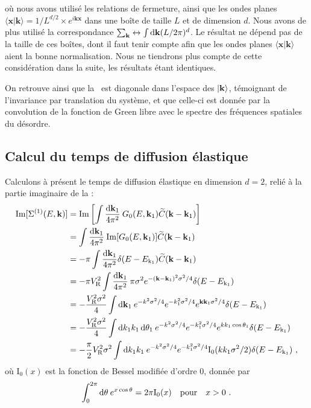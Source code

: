 où nous avons utilisé les relations de fermeture, ainsi que les ondes planes $\langle\mathbf{x}|\mathbf{k}\rangle=1/L^{d/2} \times e^{i\mathbf{k}\mathbf{x}}$ dans une boîte de taille $L$ et de dimension $d$. Nous avons de plus utilisé la correspondance $\sum_{\mathbf{k}} \leftrightarrow \int{\mathop{}\mathopen{}\mathrm{d}\mathbf{k} (L/2\pi)^d}$. Le résultat ne dépend pas de la taille de ces boîtes, dont il faut tenir compte afin que les ondes planes $\langle\mathbf{x}|\mathbf{k}\rangle$ aient la bonne normalisation. Nous ne tiendrons plus compte de cette considération dans la suite, les résultats étant identiques.

On retrouve ainsi que la \selfenergy\ est diagonale dans l'espace des $\left| \mathbf{k} \right\rangle$, témoignant de l'invariance par translation du système, et que celle-ci est donnée par la convolution de la fonction de Green libre avec le spectre des fréquences spatiales du désordre.


\subsection{Calcul du temps de diffusion élastique}
Calculons à présent le temps de diffusion élastique en dimension $d=2$, relié à la partie imaginaire de la \selfenergy :
\begin{align}
\mathrm{Im}[\Sigma^{(1)}(E,\mathbf{k})]&= \mathrm{Im} \left[ \int{\frac{\mathop{}\mathopen{}\mathrm{d}\mathbf{k}_{\mathrm{1}}}{4\pi^2}\: G_0(E,\mathbf{k}_{\mathrm{1}}) \widetilde{C}(\mathbf{k}-\mathbf{k}_{\mathrm{1}})}\right] \\ 
&= \int{\frac{\mathop{}\mathopen{}\mathrm{d}\mathbf{k}_{\mathrm{1}}}{4\pi^2}\: \mathrm{Im}[G_0(E,\mathbf{k}_{\mathrm{1}})] \widetilde{C}(\mathbf{k}-\mathbf{k}_{\mathrm{1}})} \\
&= -\pi \int{\frac{\mathop{}\mathopen{}\mathrm{d}\mathbf{k}_{\mathrm{1}}}{4\pi^2} \delta(E-E_{\mathrm{k}_1}) \widetilde{C}(\mathbf{k}-\mathbf{k}_{\mathrm{1}})} \\
&= - \pi V_{\mathrm{R}}^2 \int{\frac{\mathop{}\mathopen{}\mathrm{d}\mathbf{k}_{\mathrm{1}}}{4\pi^2} \: \pi \sigma^2 e^{-(\mathbf{k}-\mathbf{k}_{\mathrm{1}})^2 \sigma^2/4} \delta(E-E_{\mathrm{k}_1})} \\
&=-\frac{V_{\mathrm{R}}^2\sigma^2}{4} \int{\mathop{}\mathopen{}\mathrm{d}\mathbf{k}_{\mathrm{1}} \: e^{-k^2\sigma^2/4} e^{-k_{\mathrm{1}}^2\sigma^2/4} e^{\mathbf{k}\mathbf{k}_{\mathrm{1}}\sigma^2/4} \delta(E-E_{\mathrm{k}_1})}\\
&= -\frac{V_{\mathrm{R}}^2\sigma^2}{4} \int{\mathop{}\mathopen{}\mathrm{d}k_{\mathrm{1}} k_{\mathrm{1}} \mathop{}\mathopen{}\mathrm{d}\theta_{\mathrm{1}} \: e^{-k^2\sigma^2/4} e^{-k_{\mathrm{1}}^2\sigma^2/4} e^{k k_{\mathrm{1}} \cos{\theta_{\mathrm{1}}}} \delta(E-E_{\mathrm{k}_1})} \\
&= -\frac{\pi}{2} V_{\mathrm{R}}^2\sigma^2 \int{\mathop{}\mathopen{}\mathrm{d}k_{\mathrm{1}} k_{\mathrm{1}} \: e^{-k^2\sigma^2/4} e^{-k_{\mathrm{1}}^2\sigma^2/4} \mathrm{I_0}(k k_{\mathrm{1}}\sigma^2/2) \delta(E-E_{\mathrm{k}_1})} \text{ ,}
\end{align}
où $\mathrm{I_0}(x)$ est la fonction de Bessel modifiée d'ordre 0, donnée par
\begin{equation}
\int_{0}^{2\pi}{\mathop{}\mathopen{}\mathrm{d}\theta\:e^{x\cos\theta}}=2\pi \mathrm{I_0}(x) \quad \text{pour} \quad x>0 \text{ .}
\end{equation}


